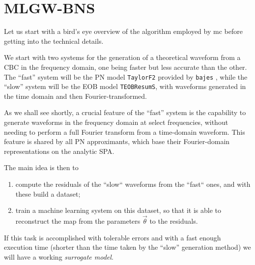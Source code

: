 \documentclass[main.tex]{subfiles}
\begin{document}
\section{MLGW-BNS}

Let us start with a bird's eye overview of the algorithm employed by \ac{mc} before getting into the technical details. 

We start with two systems for the generation of a theoretical waveform from a \ac{CBC} in the frequency domain, one being faster but less accurate than the other. 
The ``fast'' system will be the \ac{PN} model \texttt{TaylorF2} provided by \texttt{bajes} \cite[]{breschiTtBajesBayesian2021}, while the ``slow'' system will be the \ac{EOB} model \texttt{TEOBResumS}, with waveforms generated in the time domain and then Fourier-transformed. 

As we shall see shortly, a crucial feature of the ``fast'' system is the capability to generate waveforms in the frequency domain at select frequencies, without needing to perform a full Fourier transform from a time-domain waveform.
This feature is shared by all \ac{PN} approximants, which base their Fourier-domain representations on the analytic \ac{SPA}.

The main idea is then to 
\begin{enumerate}
    \item compute the residuals of the ``slow`` waveforms from the ``fast`` ones, and with these build a dataset;
    \item train a machine learning system on this dataset, so that it is able to reconstruct the map from the parameters \(\vec{\theta}\) to the residuals.
\end{enumerate}

If this task is accomplished with tolerable errors and with a fast enough execution time (shorter than the time taken by the ``slow'' generation method) we will have a working \emph{surrogate model}. 



\end{document}
